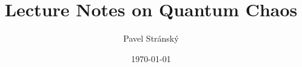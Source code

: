 \documentclass[a4paper,11pt,twoside]{article}
\begin{document}
\theoremstyle{red}
\newtheorem{task}{Task}[section]

\theoremstyle{spaced}
\newtheorem{theorem}{Theorem}[section]

\theoremstyle{spaced}
\newtheorem{definition}{Definition}[section]

\theoremstyle{spaced}
\newtheorem{example}{Example}[section]

\theoremstyle{blue}
\newtheorem{solution}{Solution}[section]

\title{Lecture Notes on Quantum Chaos}
\date{\today}
\author{Pavel Stránský}

\maketitle
\tableofcontents

\newpage
\end{document}
